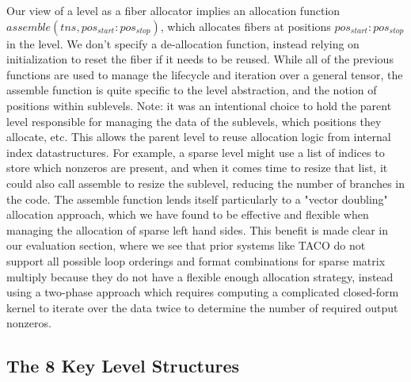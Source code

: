Our view of a level as a fiber allocator implies an allocation function
$assemble(tns, pos_{start}:pos_{stop})$, which allocates fibers at positions
$pos_{start}:pos_{stop}$ in the level. We don't specify a de-allocation
function, instead relying on initialization to reset the fiber if it needs to be
reused. While all of the previous functions are used to manage the lifecycle and
iteration over a general tensor, the assemble function is quite specific to the
level abstraction, and the notion of positions within sublevels. Note: it was an
intentional choice to hold the parent level responsible for managing the
data of the sublevels, which positions they allocate, etc. This allows the parent
level to reuse allocation logic from internal index datastructures. For example,
a sparse level might use a list of indices to store which nonzeros are present,
and when it comes time to resize that list, it could also call assemble to resize the
sublevel, reducing the number of branches in the code. The assemble function
lends itself particularly to a "vector doubling" allocation approach, which we
have found to be effective and flexible when managing the allocation
of sparse left hand sides. This benefit is made clear in our evaluation section,
where we see that prior systems like TACO do not support all possible loop
orderings and format combinations for sparse matrix multiply because they do
not have a flexible enough allocation strategy, instead using a two-phase approach
which requires computing a complicated closed-form kernel to iterate over the
data twice to determine the number of required output nonzeros.

\subsection{The 8 Key Level Structures}



